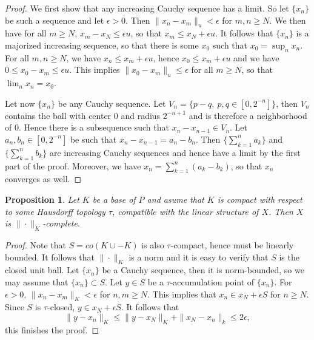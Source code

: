 \documentclass[12pt]{article}
\newtheorem{prop}{Proposition}
\theoremstyle{remark}
\newcommand{\<}{\langle}
\begin{document}
\begin{proof} We first show that any increasing Cauchy sequence has a limit. So let $\{x_n\}$ be such a sequence and let $\epsilon>0$. Then $\|x_n-x_m\|_u< \epsilon$ for $m,n\ge N$. We then have for all $m\ge N$, $x_m-x_N\le \epsilon u$, so that $x_m\le x_N+\epsilon u$. It follows that $\{x_n\}$ is a majorized increasing sequence, so that 
there is some $x_0$ such that $x_0=\sup_n x_n$. For all $m,n \ge N$, we have $x_n\le x_m+\epsilon u$, hence $x_0\le x_m+\epsilon u$ and we have 
$0\le x_0-x_m\le \epsilon u$. This implies $\|x_0-x_m\|_u\le \epsilon$ for all $m\ge N$, so that $\lim_n x_n=x_0$. 

Let now $\{x_n\}$ be any Cauchy sequence. Let $V_n=\{p-q,\ p,q\in [0,2^{-n}]\}$, then $V_n$ contains the ball with center 0 and radius $2^{-{n+1}}$ and is therefore a neighborhood of 0.  Hence there is a subsequence such that $x_n-x_{n-1}\in V_n$. Let $a_n,b_n\in [0,2^{-n}]$ be such that $x_n-x_{n-1}=a_n-b_n$. Then $\{\sum_{k=1}^n a_k\}$
 and $\{\sum_{k=1}^n b_k\}$ are increasing Cauchy sequences and hence have a limit by the first part of the proof. Moreover, we have 
$x_n=\sum_{k=1}^n(a_k-b_k)$, so that $x_n$ converges as well.



\end{proof}



\begin{prop}\label{prop:bn_complete}\cite{alfsen}  Let $K$ be a base of $P$  and asume that $K$ is compact with respect to some Hausdorff topology $\tau$, compatible with the linear structure of $X$. Then $X$ is $\|\cdot\|_K$-complete.

\end{prop}

\begin{proof} Note that $S=co(K\cup-K)$ is also $\tau$-compact, hence  must be linearly bounded. It follows that $\|\cdot\|_K$ is a norm and it is easy to verify that $S$ is the closed unit ball. Let $\{x_n\}$ be a Cauchy sequence, then it is norm-bounded, so we may assume that $\{x_n\}\subset S$.  Let $y\in S$ be a $\tau$-accumulation point of $\{x_n\}$. For $\epsilon>0$, $\|x_n-x_m\|_K<\epsilon$ for $n,m\ge N$. This implies that
$x_n\in x_N+\epsilon S$ for $n\ge N$. Since $S$ is $\tau$-closed,  $y\in x_N+\epsilon S$. It follows  that
\[
\|y-x_n\|_K\le \|y-x_N\|_K+\|x_N-x_n\|_k\le 2\epsilon,
\]
this finishes the proof.


\end{proof}
\end{document}
